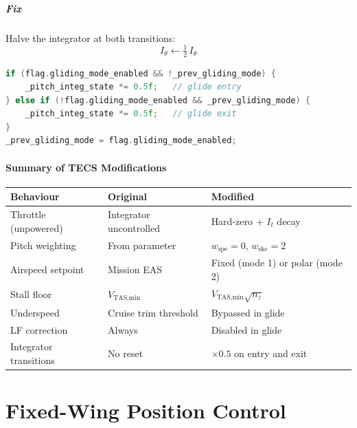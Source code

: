 \documentclass[12pt,a4paper]{report}
\begin{document}
\subsubsection{Fix}

Halve the integrator at both transitions:
\begin{equation}
  \boxed{I_\theta \leftarrow \tfrac{1}{2}\,I_\theta}
\end{equation}

\begin{lstlisting}[language=C++]
if (flag.gliding_mode_enabled && !_prev_gliding_mode) {
    _pitch_integ_state *= 0.5f;   // glide entry
} else if (!flag.gliding_mode_enabled && _prev_gliding_mode) {
    _pitch_integ_state *= 0.5f;   // glide exit
}
_prev_gliding_mode = flag.gliding_mode_enabled;
\end{lstlisting}

\subsection{Summary of TECS Modifications}

\begin{center}
\begin{tabular}{p{4cm}p{4.5cm}p{4.5cm}}
\toprule
Behaviour & Original & Modified \\
\midrule
Throttle (unpowered) & Integrator uncontrolled & Hard-zero + $I_t$ decay \\
Pitch weighting & From parameter & $w_{\text{spe}}=0$, $w_{\text{ske}}=2$ \\
Airspeed setpoint & Mission EAS & Fixed (mode 1) or polar (mode 2) \\
Stall floor & $V_{\text{TAS,min}}$ & $V_{\text{TAS,min}}\sqrt{n_z}$ \\
Underspeed & Cruise trim threshold & Bypassed in glide \\
LF correction & Always & Disabled in glide \\
Integrator transitions & No reset & $\times 0.5$ on entry and exit \\
\bottomrule
\end{tabular}
\end{center}

\part{Fixed-Wing Position Control}
\end{document}
